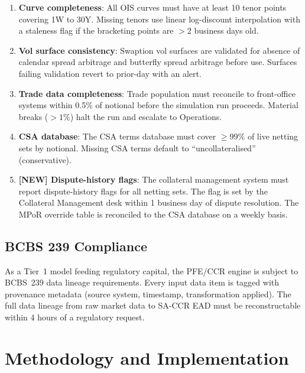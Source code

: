 \documentclass[11pt,a4paper]{article}
\begin{document}
\begin{enumerate}[noitemsep]
  \item \textbf{Curve completeness}: All OIS curves must have at least 10 tenor
        points covering 1W to 30Y. Missing tenors use linear log-discount
        interpolation with a staleness flag if the bracketing points are
        $>2$ business days old.
  \item \textbf{Vol surface consistency}: Swaption vol surfaces are validated
        for absence of calendar spread arbitrage and butterfly spread arbitrage
        before use. Surfaces failing validation revert to prior-day with an
        alert.
  \item \textbf{Trade data completeness}: Trade population must reconcile to
        front-office systems within 0.5\% of notional before the simulation
        run proceeds. Material breaks ($>1\%$) halt the run and escalate to
        Operations.
  \item \textbf{CSA database}: The CSA terms database must cover $\geq 99\%$
        of live netting sets by notional. Missing CSA terms default to
        ``uncollateralised'' (conservative).
  \item \textbf{[NEW] Dispute-history flags}: The collateral management system
        must report dispute-history flags for all netting sets. The flag is
        set by the Collateral Management desk within 1 business day of dispute
        resolution. The MPoR override table is reconciled to the CSA database
        on a weekly basis.
\end{enumerate}

\subsection{BCBS 239 Compliance}

As a Tier~1 model feeding regulatory capital, the PFE/CCR engine is subject to
BCBS~239 data lineage requirements. Every input data item is tagged with
provenance metadata (source system, timestamp, transformation applied).
The full data lineage from raw market data to SA-CCR EAD must be
reconstructable within 4 hours of a regulatory request.

\section{Methodology and Implementation}
\end{document}
